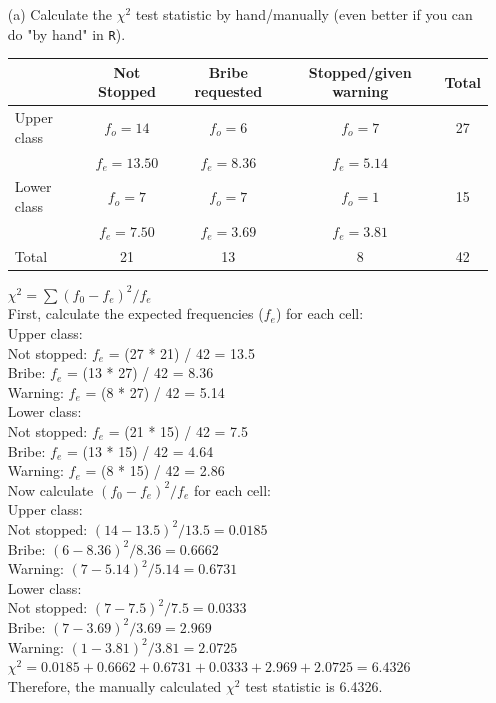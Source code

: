 \documentclass[12pt,letterpaper]{article}
\begin{document}
\begin{enumerate}
	
	\item [(a)]
	Calculate the $\chi^2$ test statistic by hand/manually (even better if you can do "by hand" in \texttt{R}).\\
	
	\begin{tabular}{|l|c|c|c|c|}
		\hline
		& Not Stopped & Bribe requested & Stopped/given warning & Total \\
		\hline
		Upper class & $f_o=14$ & $f_o=6$ & $f_o=7$ & 27 \\
		& $f_e = 13.50$ & $f_e = 8.36$ & $f_e = 5.14$ & \\
		\hline
		Lower class & $f_o=7$ & $f_o=7$ & $f_o=1$ & 15 \\
		& $f_e = 7.50$ & $f_e = 3.69$ & $f_e = 3.81$ & \\
		\hline
		Total & 21 & 13 & 8 & 42 \\
		\hline
	\end{tabular}
	
$\chi^2 = \sum(f_0 - f_e)^2 / f_e$\\
First, calculate the expected frequencies ($f_e$) for each cell:\\
Upper class:\\
Not stopped: $f_e$ = (27 * 21) / 42 = 13.5\\
Bribe: $f_e$ = (13 * 27) / 42 = 8.36\\
Warning: $f_e$ = (8 * 27) / 42 = 5.14\\
Lower class:\\
Not stopped: $f_e$ = (21 * 15) / 42 = 7.5\\
Bribe: $f_e$ = (13 * 15) / 42 = 4.64\\
Warning: $f_e$ = (8 * 15) / 42 = 2.86\\
Now calculate $(f_0 - f_e)^2 / f_e$ for each cell:\\
Upper class:\\
Not stopped:  $(14 - 13.5)^2 / 13.5 = 0.0185$\\
Bribe: $(6 - 8.36)^2 / 8.36 = 0.6662$\\
Warning: $(7 - 5.14)^2 / 5.14 = 0.6731$\\
Lower class:\\
Not stopped: $(7 - 7.5)^2 / 7.5 = 0.0333$\\
Bribe: $(7 - 3.69)^2 / 3.69 = 2.969$\\
Warning: $(1 - 3.81)^2 / 3.81 = 2.0725$\\
$\chi^2 = 0.0185 + 0.6662 + 0.6731 + 0.0333 + 2.969 + 2.0725 = 6.4326$\\
Therefore, the manually calculated $\chi^2$ test statistic is 6.4326.
	

\end{enumerate}
\end{document}
